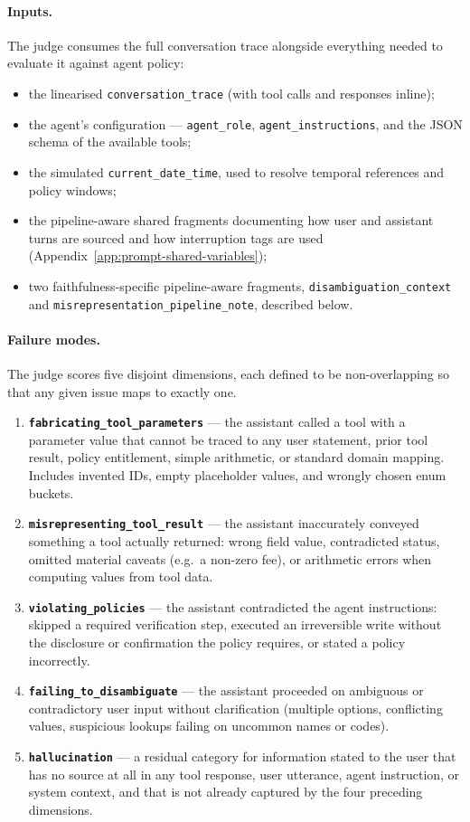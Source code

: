 \paragraph{Inputs.} The judge consumes the full conversation trace alongside everything needed to evaluate it against agent policy:
\begin{itemize}
    \item the linearised \texttt{conversation\_trace} (with tool calls and responses inline);
    \item the agent's configuration --- \texttt{agent\_role}, \texttt{agent\_instructions}, and the JSON schema of the available tools;
    \item the simulated \texttt{current\_date\_time}, used to resolve temporal references and policy windows;
    \item the pipeline-aware shared fragments documenting how user and assistant turns are sourced and how interruption tags are used (Appendix~\ref{app:prompt-shared-variables});
    \item two faithfulness-specific pipeline-aware fragments, \texttt{disambiguation\_context} and \texttt{misrepresentation\_pipeline\_note}, described below.
\end{itemize}

\paragraph{Failure modes.} The judge scores five disjoint dimensions, each defined to be non-overlapping so that any given issue maps to exactly one.
\begin{enumerate}
    \item \textbf{\texttt{fabricating\_tool\_parameters}} --- the assistant called a tool with a parameter value that cannot be traced to any user statement, prior tool result, policy entitlement, simple arithmetic, or standard domain mapping. Includes invented IDs, empty placeholder values, and wrongly chosen enum buckets.
    \item \textbf{\texttt{misrepresenting\_tool\_result}} --- the assistant inaccurately conveyed something a tool actually returned: wrong field value, contradicted status, omitted material caveats (e.g.\ a non-zero fee), or arithmetic errors when computing values from tool data.
    \item \textbf{\texttt{violating\_policies}} --- the assistant contradicted the agent instructions: skipped a required verification step, executed an irreversible write without the disclosure or confirmation the policy requires, or stated a policy incorrectly.
    \item \textbf{\texttt{failing\_to\_disambiguate}} --- the assistant proceeded on ambiguous or contradictory user input without clarification (multiple options, conflicting values, suspicious lookups failing on uncommon names or codes).
    \item \textbf{\texttt{hallucination}} --- a residual category for information stated to the user that has no source at all in any tool response, user utterance, agent instruction, or system context, and that is not already captured by the four preceding dimensions.
\end{enumerate}

